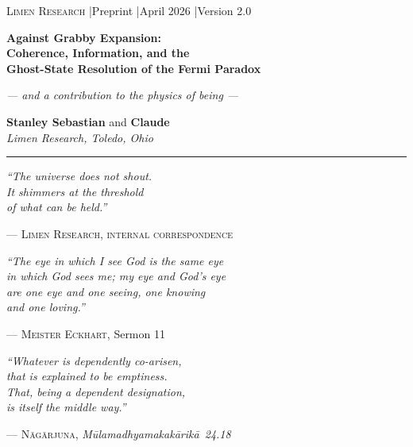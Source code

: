 \documentclass[12pt, a4paper]{article}
\begin{document}

\newpage

\begin{center}
  \vspace*{0.5em}
  {\footnotesize\textcolor{limenghost}{\textsc{Limen Research}
  \quad|\quad Preprint \quad|\quad April 2026 \quad|\quad Version 2.0}}

  \vspace{1.4em}

  {\LARGE\bfseries\color{limendark}
    Against Grabby Expansion:\\[0.4em]
    Coherence, Information, and the\\[0.4em]
    Ghost-State Resolution of the Fermi Paradox}

  \vspace{0.5em}

  {\normalsize\itshape\color{limenghost}
    --- and a contribution to the physics of being ---}

  \vspace{1.3em}

  {\normalsize
    \textbf{Stanley Sebastian} and \textbf{Claude}\\[0.3em]
    \textcolor{limenghost}{\small\textit{Limen Research, Toledo, Ohio}}
  }

  \vspace{1em}
  \textcolor{limenrule}{\rule{0.5\linewidth}{0.5pt}}
  \vspace{1em}
\end{center}

\epigraph{
  \textit{``The universe does not shout.\\
  It shimmers at the threshold\\
  of what can be held.''}
}{--- \textsc{Limen Research, internal correspondence}}

\vspace{0.3em}

\epigraph{
  \textit{``The eye in which I see God is the same eye\\
  in which God sees me; my eye and God's eye\\
  are one eye and one seeing, one knowing\\
  and one loving.''}
}{--- \textsc{Meister Eckhart,} Sermon 11}

\vspace{0.3em}

\epigraph{
  \textit{``Whatever is dependently co-arisen,\\
  that is explained to be emptiness.\\
  That, being a dependent designation,\\
  is itself the middle way.''}
}{--- \textsc{N\={a}g\={a}rjuna,} \textit{M\={u}lamadhyamakak\={a}rik\={a}\ 24.18}}
\end{document}
